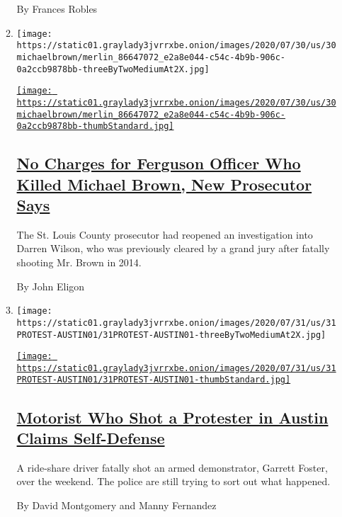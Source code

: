 \begin{enumerate}
\begin{enumerate}
    By Frances Robles
  \item
    \texttt{[image: https://static01.graylady3jvrrxbe.onion/images/2020/07/30/us/30michaelbrown/merlin\_86647072\_e2a8e044-c54c-4b9b-906c-0a2ccb9878bb-threeByTwoMediumAt2X.jpg]}

    \href{/2020/07/30/us/michael-brown-darren-wilson-ferguson.html}{\texttt{[image: https://static01.graylady3jvrrxbe.onion/images/2020/07/30/us/30michaelbrown/merlin\_86647072\_e2a8e044-c54c-4b9b-906c-0a2ccb9878bb-thumbStandard.jpg]}}

    \hypertarget{no-charges-for-ferguson-officer-who-killed-michael-brown-new-prosecutor-says}{%
    \subsection{\texorpdfstring{\href{/2020/07/30/us/michael-brown-darren-wilson-ferguson.html}{No
    Charges for Ferguson Officer Who Killed Michael Brown, New
    Prosecutor
    Says}}{No Charges for Ferguson Officer Who Killed Michael Brown, New Prosecutor Says}}\label{no-charges-for-ferguson-officer-who-killed-michael-brown-new-prosecutor-says}}

    The St. Louis County prosecutor had reopened an investigation into
    Darren Wilson, who was previously cleared by a grand jury after
    fatally shooting Mr. Brown in 2014.

    By John Eligon
  \item
    \texttt{[image: https://static01.graylady3jvrrxbe.onion/images/2020/07/31/us/31PROTEST-AUSTIN01/31PROTEST-AUSTIN01-threeByTwoMediumAt2X.jpg]}

    \href{/2020/07/31/us/austin-protest-shooting-foster-perry.html}{\texttt{[image: https://static01.graylady3jvrrxbe.onion/images/2020/07/31/us/31PROTEST-AUSTIN01/31PROTEST-AUSTIN01-thumbStandard.jpg]}}

    \hypertarget{motorist-who-shot-a-protester-in-austin-claims-self-defense}{%
    \subsection{\texorpdfstring{\href{/2020/07/31/us/austin-protest-shooting-foster-perry.html}{Motorist
    Who Shot a Protester in Austin Claims
    Self-Defense}}{Motorist Who Shot a Protester in Austin Claims Self-Defense}}\label{motorist-who-shot-a-protester-in-austin-claims-self-defense}}

    A ride-share driver fatally shot an armed demonstrator, Garrett
    Foster, over the weekend. The police are still trying to sort out
    what happened.

    By David Montgomery and Manny Fernandez
  \end{enumerate}
\end{enumerate}

